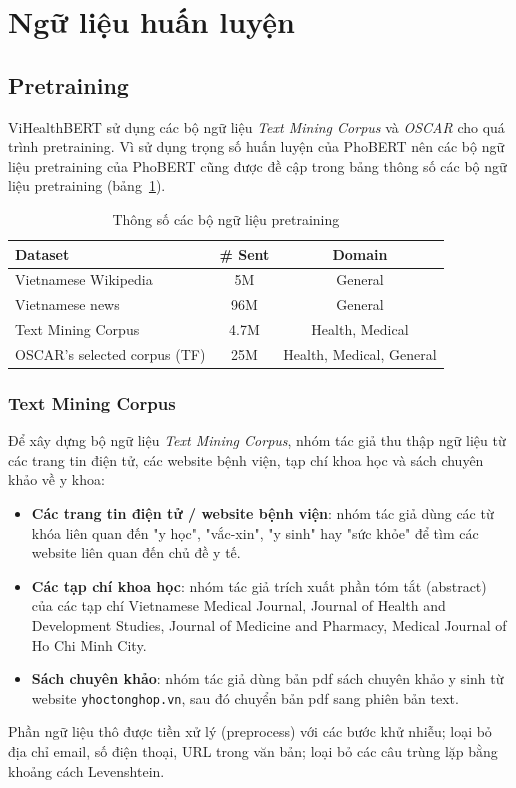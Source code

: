 \section{Ngữ liệu huấn luyện}
\subsection{Pretraining}
ViHealthBERT sử dụng các bộ ngữ liệu \textit{Text Mining Corpus} và \textit{OSCAR} cho quá trình pretraining. Vì sử dụng trọng số huấn luyện của PhoBERT nên các bộ ngữ liệu pretraining của PhoBERT cũng được đề cập trong bảng thông số các bộ ngữ liệu pretraining (bảng~\ref{tab:pretraining-stats}).

\begin{table}
\centering
\begin{tabular}{|l|c|c|}
\hline
\textbf{Dataset} & \textbf{\# Sent} & \textbf{Domain} \\ \hline
Vietnamese Wikipedia & 5M & General \\ \hline
Vietnamese news & 96M & General \\ \hline
Text Mining Corpus & 4.7M & Health, Medical \\ \hline
OSCAR's selected corpus (TF) & 25M  & Health, Medical, General \\ \hline
\end{tabular}
\caption{Thông số các bộ ngữ liệu pretraining\cite{minh-EtAl:2022:LREC}}
\label{tab:pretraining-stats}
\end{table}

\subsubsection{Text Mining Corpus}
Để xây dựng bộ ngữ liệu \textit{Text Mining Corpus}, nhóm tác giả thu thập ngữ liệu từ các trang tin điện tử, các website bệnh viện, tạp chí khoa học và sách chuyên khảo về y khoa:
\begin{itemize}
\item \textbf{Các trang tin điện tử / website bệnh viện}: nhóm tác giả dùng các từ khóa liên quan đến "y học", "vắc-xin", "y sinh" hay "sức khỏe" để tìm các website liên quan đến chủ đề y tế.
\item \textbf{Các tạp chí khoa học}: nhóm tác giả trích xuất phần tóm tắt (abstract) của các tạp chí Vietnamese Medical Journal, Journal of Health and Development Studies, Journal of Medicine and Pharmacy, Medical Journal of Ho Chi Minh City.
\item \textbf{Sách chuyên khảo}: nhóm tác giả dùng bản pdf sách chuyên khảo y sinh từ website \texttt{yhoctonghop.vn}, sau đó chuyển bản pdf sang phiên bản text.
\end{itemize}
Phần ngữ liệu thô được tiền xử lý (preprocess) với các bước khử nhiễu; loại bỏ địa chỉ email, số điện thoại, URL trong văn bản; loại bỏ các câu trùng lặp bằng khoảng cách Levenshtein.


